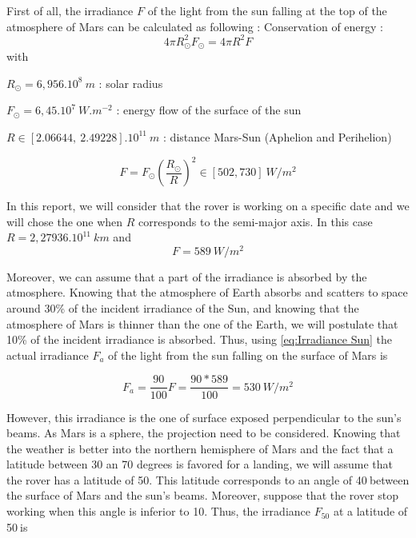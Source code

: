 First of all, the irradiance $F$ of the light from the sun falling at the top of the atmosphere of Mars can be calculated as following :
Conservation of energy :
\begin{equation}
\label{eq:conservation of energy}
4\pi R_\odot^2F_\odot=4\pi R^2F
\end{equation}
with 

$R_\odot=6,956.10^8\ m$ : solar radius

$F_\odot=6,45.10^7\ W.m^{-2}$ : energy flow of the surface of the sun

$R \in [2.06644,\ 2.49228].10^{11} \ m$ : distance Mars-Sun (Aphelion and Perihelion)

\begin{equation}
\label{eq:Irradiance Sun range}
F = F_\odot \left(\frac{R_\odot}{R}\right)^2 \in [502, 730]\ W/m^2
\end{equation}

In this report, we will consider that the rover is working on a specific date and we will chose the one when $R$ corresponds to the semi-major axis. In this case $R=2,27936.10^{11}\ km$ and
\begin{equation}
\label{eq:Irradiance Sun}
F = 589\ W/m^2
\end{equation}



Moreover, we can assume that a part of the irradiance is absorbed by the atmosphere. Knowing that the atmosphere of Earth absorbs and scatters to space around 30\% of the incident irradiance of the Sun\cite{yamamoto1962direct}, and knowing  that the atmosphere of Mars is thinner than the one of the Earth, we will postulate that 10\% of the incident irradiance is absorbed. Thus, using \ref{eq:Irradiance Sun} the actual irradiance $F_a$ of the light from the sun falling on the surface of Mars is

\begin{equation}
\label{eq:Actual Irradiance Sun}
F_a = \frac{90}{100}F = \frac{90*589}{100} = 530\ W/m^2
\end{equation}

However, this irradiance is the one of surface exposed perpendicular to the sun's beams. As Mars is a sphere, the projection need to be considered.
Knowing that the weather is better into the northern hemisphere of Mars\cite{wiki:weather} and the fact that a latitude between 30 an 70 degrees is favored for a landing\cite{latitude}, we will assume that the rover has a latitude of 50\textdegree. This latitude corresponds to an angle of 40\textdegree$\ $between the surface of Mars and the sun's beams. Moreover, suppose that the rover stop working when this angle is inferior to 10\textdegree. Thus, the irradiance $F_{50}$ at a latitude of 50\textdegree$\ $is

